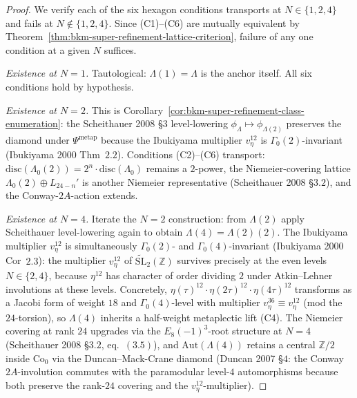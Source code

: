 \begin{proof}[Proof]
We verify each of the six hexagon conditions transports at
$N\in\{1,2,4\}$ and fails at $N\notin\{1,2,4\}$. Since (C1)--(C6)
are mutually equivalent by
Theorem~\ref{thm:bkm-super-refinement-lattice-criterion}, failure of
any one condition at a given $N$ suffices.

\emph{Existence at $N=1$.} Tautological: $\Lambda(1)=\Lambda$ is the
anchor itself. All six conditions hold by hypothesis.

\emph{Existence at $N=2$.} This is
Corollary~\ref{cor:bkm-super-refinement-class-enumeration}: the
Scheithauer 2008 \S$3$ level-lowering
$\phi_\Lambda\mapsto\phi_{\Lambda(2)}$ preserves the diamond under
$\Psi^{\mathrm{metap}}$ because the Ibukiyama multiplier
$v_\eta^{12}$ is $\Gamma_0(2)$-invariant (Ibukiyama 2000 Thm~$2.2$).
Conditions (C2)--(C6) transport: $\mathrm{disc}(\Lambda_0(2)) =
2^n\cdot\mathrm{disc}(\Lambda_0)$ remains a $2$-power, the
Niemeier-covering lattice $\Lambda_0(2)\oplus L_{24-n}'$ is another
Niemeier representative (Scheithauer 2008 \S$3.2$), and the
Conway-$2A$-action extends.

\emph{Existence at $N=4$.} Iterate the $N=2$ construction: from
$\Lambda(2)$ apply Scheithauer level-lowering again to obtain
$\Lambda(4) = \Lambda(2)(2)$. The Ibukiyama multiplier
$v_\eta^{12}$ is simultaneously $\Gamma_0(2)$- and
$\Gamma_0(4)$-invariant (Ibukiyama 2000 Cor~$2.3$): the multiplier
$v_\eta^{12}$ of $\widetilde{\mathrm{SL}}_2(\mathbb{Z})$ survives
precisely at the even levels $N\in\{2,4\}$, because
$\eta^{12}$ has character of order dividing $2$ under
Atkin--Lehner involutions at these levels. Concretely,
$\eta(\tau)^{12}\cdot \eta(2\tau)^{12}\cdot\eta(4\tau)^{12}$ transforms
as a Jacobi form of weight $18$ and $\Gamma_0(4)$-level with
multiplier $v_\eta^{36}\equiv v_\eta^{12}$ (mod the
$24$-torsion), so $\Lambda(4)$ inherits a half-weight metaplectic
lift (C4). The Niemeier covering at rank $24$ upgrades via the
$E_8(-1)^3$-root structure at $N=4$
(Scheithauer 2008 \S$3.2$, eq.~$(3.5)$), and
$\mathrm{Aut}(\Lambda(4))$ retains a central $\mathbb{Z}/2$ inside
$\mathrm{Co}_0$ via the Duncan--Mack-Crane diamond
(Duncan 2007 \S$4$: the Conway $2A$-involution commutes with the
paramodular level-$4$ automorphisms because both preserve the
rank-$24$ covering and the $v_\eta^{12}$-multiplier).


\end{proof}
